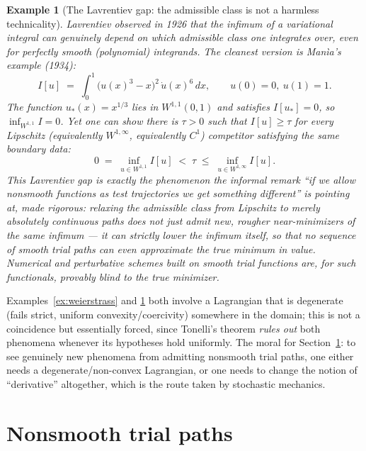 \documentclass[11pt]{article}
\newtheorem{example}[theorem]{Example}
\begin{document}
\begin{example}[The Lavrentiev gap: the admissible class is not a harmless technicality]
\label{ex:lavrentiev}
Lavrentiev observed in 1926 that the infimum of a variational integral can genuinely depend on which admissible class one integrates over, even for perfectly smooth (polynomial) integrands. The cleanest version is Man\`ia's example (1934):
\[
I[u] \;=\; \int_0^1 \bigl(u(x)^3-x\bigr)^2\, \dot u(x)^6\, dx, \qquad u(0)=0,\ u(1)=1.
\]
The function $u_\ast(x)=x^{1/3}$ lies in $W^{1,1}(0,1)$ and satisfies $I[u_\ast]=0$, so $\inf_{W^{1,1}} I = 0$. Yet one can show there is $\tau>0$ such that $I[u]\ge \tau$ for \emph{every} Lipschitz (equivalently $W^{1,\infty}$, equivalently $C^1$) competitor satisfying the same boundary data:
\[
0 \;=\; \inf_{u\in W^{1,1}} I[u] \;<\; \tau \;\le\; \inf_{u \in W^{1,\infty}} I[u].
\]
This \emph{Lavrentiev gap} is exactly the phenomenon the informal remark ``if we allow nonsmooth functions as test trajectories we get something different'' is pointing at, made rigorous: relaxing the admissible class from Lipschitz to merely absolutely continuous paths does not just admit new, rougher near-minimizers of the same infimum --- it can strictly lower the infimum itself, so that no sequence of smooth trial paths can even approximate the true minimum in value. Numerical and perturbative schemes built on smooth trial functions are, for such functionals, provably blind to the true minimizer.
\end{example}

Examples~\ref{ex:weierstrass} and \ref{ex:lavrentiev} both involve a Lagrangian that is degenerate (fails strict, uniform convexity/coercivity) somewhere in the domain; this is not a coincidence but essentially forced, since Tonelli's theorem \emph{rules out} both phenomena whenever its hypotheses hold uniformly. The moral for Section~\ref{sec:nonsmooth}: to see genuinely new phenomena from admitting nonsmooth trial paths, one either needs a degenerate/non-convex Lagrangian, or one needs to change the notion of ``derivative'' altogether, which is the route taken by stochastic mechanics.

\section{Nonsmooth trial paths}
\label{sec:nonsmooth}
\end{document}
